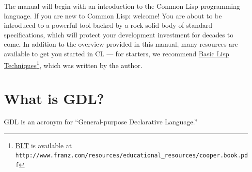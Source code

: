 \documentclass [11pt]{book}
\begin{document}
The manual will begin with an introduction to the Common Lisp programming language. If you are new to Common Lisp: welcome!
You are about to be introduced to a powerful tool backed by a
rock-solid body of standard specifications, which will protect your
development investment for decades to come. In addition to the
overview provided in this manual, many resources are available to get
you started in CL --- for starters, we recommend 
\underline{Basic Lisp Techniques}\footnote{
\underline{BLT} is available at \texttt{http://www.franz.com/resources/educational\_resources/cooper.book.pdf}}, which was written by the author. 

\section{What is GDL?}

\label{sec:whatisgdl?}

GDL is an acronym for
``General-purpose Declarative Language.''
\end{document}
